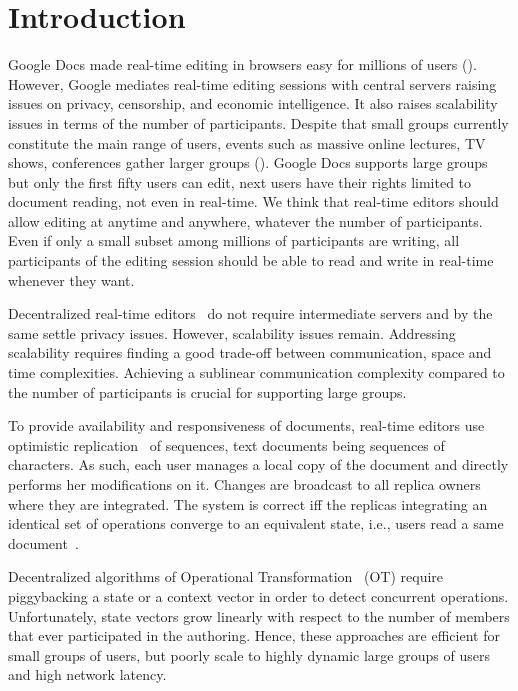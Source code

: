 
\section{Introduction}

Google Docs made real-time editing in browsers easy for millions of users
(\REF). However, Google mediates real-time editing sessions with central servers
raising issues on privacy, censorship, and economic intelligence. It also raises
scalability issues in terms of the number of participants.  Despite that small
groups currently constitute the main range of users, events such as massive
online lectures, TV shows, conferences gather larger groups (\REF).  Google Docs
supports large groups but only the first fifty users can edit, next users have
their rights limited to document reading, not even in real-time.  We think that
real-time editors should allow editing at anytime and anywhere, whatever the
number of participants. Even if only a small subset among millions of
participants are writing, all participants of the editing session should be able
to read and write in real-time whenever they want.

Decentralized real-time editors~\cite{oster2006data, sun1998operational,
  sun2009contextbased} do not require intermediate servers and by the same
settle privacy issues. However, scalability issues remain.  Addressing
scalability requires finding a good trade-off between communication, space and
time complexities. Achieving a sublinear communication complexity compared to
the number of participants is crucial for supporting large groups.

To provide availability and responsiveness of documents, real-time editors use
optimistic replication~\cite{saito2005optimistic} of sequences, text documents
being sequences of characters. As such, each user manages a local copy of the
document and directly performs her modifications on it. Changes are broadcast to
all replica owners where they are integrated. The system is correct iff the
replicas integrating an identical set of operations converge to an equivalent
state, i.e., users read a same document~\cite{shapiro2011conflict}.

Decentralized algorithms of Operational
Transformation~\cite{sun2009contextbased} (OT) require piggybacking a state or a
context vector in order to detect concurrent operations. Unfortunately, state
vectors grow linearly with respect to the number of members that ever
participated in the authoring. Hence, these approaches are efficient for small
groups of users, but poorly scale to highly dynamic large groups of users and
high network latency.

